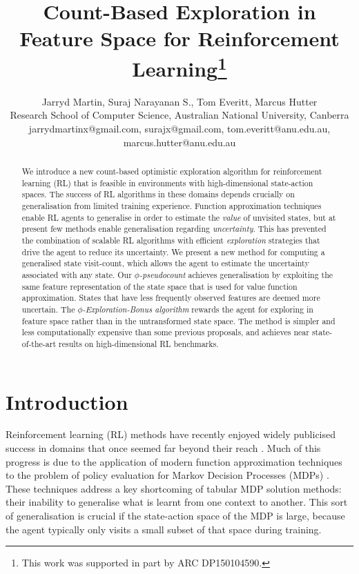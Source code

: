 \documentclass{article}
\title{Count-Based Exploration in Feature Space for Reinforcement Learning\thanks{This work was supported in part by ARC DP150104590.}}
\author{Jarryd Martin, Suraj Narayanan S., Tom Everitt, Marcus Hutter\\
Research School of Computer Science, Australian National University, Canberra\\
jarrydmartinx@gmail.com, surajx@gmail.com, tom.everitt@anu.edu.au, marcus.hutter@anu.edu.au}
\theoremstyle{definition}
\theoremstyle{definition}
\theoremstyle{plain}
\theoremstyle{plain}
\theoremstyle{plain}
\begin{document}
\maketitle
\begin{abstract}
We introduce a new count-based optimistic exploration algorithm for
reinforcement learning (RL) that is feasible in environments with
high-dimensional state-action spaces. The success of RL algorithms
in these domains depends crucially on generalisation from limited
training experience. Function approximation techniques enable RL agents
to generalise in order to estimate the \emph{value} of unvisited states,
but at present few methods enable generalisation regarding\emph{ uncertainty}.
This has prevented the combination of scalable RL algorithms with
efficient \emph{exploration} strategies that drive the agent to reduce
its uncertainty. We present a new method for computing a generalised
state visit-count, which allows the agent to estimate the uncertainty
associated with any state. Our\emph{ $\phi$-pseudocount} achieves
generalisation by exploiting the same feature representation of the
state space that is used for value function approximation. States
that have less frequently observed features are deemed more uncertain.
The \emph{$\phi$-Exploration-Bonus algorithm} rewards the agent for
exploring in feature space rather than in the untransformed state
space. The method is simpler and less computationally expensive than
some previous proposals, and achieves near state-of-the-art results
on high-dimensional RL benchmarks.
\end{abstract}

\section{Introduction}

Reinforcement learning (RL) methods have recently enjoyed widely publicised
success in domains that once seemed far beyond their reach \cite{Mnih2015}.
Much of this progress is due to the application of modern function
approximation techniques to the problem of policy evaluation for Markov
Decision Processes (MDPs) \cite{Sutton1998}. These techniques address
a key shortcoming of tabular MDP solution methods: their inability
to generalise what is learnt from one context to another. This sort
of generalisation is crucial if the state-action space of the MDP
is large, because the agent typically only visits a small subset of
that space during training.
\end{document}
